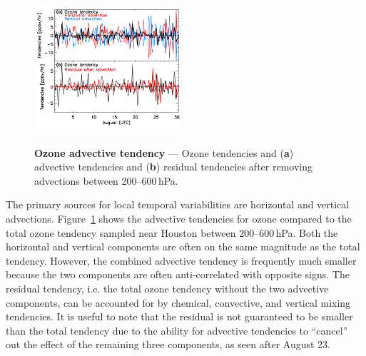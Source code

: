 	\begin{figure}
		\centering
		\begin{singlespacing}
		\vspace{-.2in}
		\label{fig:2006/tend_residual}
		\includegraphics[width=0.48\textwidth]{tendency/residual}
		\caption[Ozone advective tendency]{{\small\textbf{Ozone advective tendency} --- Ozone tendencies and ({\bf a}) advective tendencies
		and ({\bf b}) residual tendencies after removing advections between 200--600\,\unit{hPa}. \vspace{-.2in}}}
		\end{singlespacing}
	\end{figure}


The primary sources for local temporal variabilities are horizontal and vertical advections. Figure~\ref{fig:2006/tend_residual} shows
the advective tendencies for ozone compared to the total ozone tendency sampled near Houston between 200--600\,\unit{hPa}.
Both the horizontal and vertical components are often on the same magnitude as the total tendency. However, the combined
advective tendency is frequently much smaller because the two components are often anti-correlated with opposite signs. The residual
tendency, i.e. the total ozone tendency without the two advective components, can be accounted for by chemical, convective, and
vertical mixing tendencies. It is useful to note that the residual is not guaranteed to be smaller than the total tendency due to the ability for advective tendencies
to ``cancel'' out the effect of the remaining three components, as seen after August 23.

